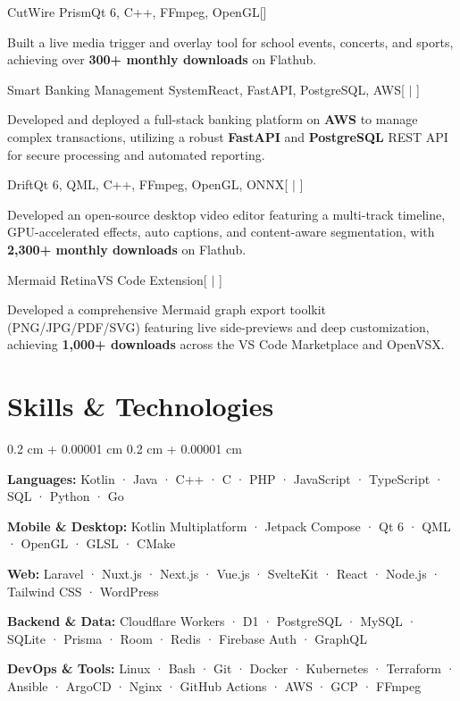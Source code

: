 \documentclass[10pt, letterpaper]{article}
\newenvironment{onecolentry}{
    \begin{adjustwidth}{
        0.2 cm + 0.00001 cm
    }{
        0.2 cm + 0.00001 cm
    }
}{
    \end{adjustwidth}
    \vspace{0.12cm}
}
\let\hrefWithoutArrow\href
\renewcommand{\href}[2]{\hrefWithoutArrow{#1}{\ifthenelse{\equal{#2}{}}{ }{#2 }\raisebox{.15ex}{\footnotesize \faExternalLink*}}}
\newcommand{\repo}[1]{\hfill\hrefWithoutArrow{#1}{\faGithub}}
\newcommand{\repolive}[2]{\hfill\hrefWithoutArrow{#1}{\faGithub} $|$ \hrefWithoutArrow{#2}{\faExternalLink*}}
\newcommand{\skillline}[2]{%
    \textbf{#1:} #2\par\vspace{0.10cm}%
}
\begin{document}
    \begin{project}{CutWire Prism}{Qt 6, C++, FFmpeg, OpenGL}[\repo{https://github.com/CutWire-Studios/SwitchX}]
        \item Built a live media trigger and overlay tool for school events, concerts, and sports, achieving over \textbf{300+ monthly downloads} on Flathub.
    \end{project}

    \begin{project}{Smart Banking Management System}{React, FastAPI, PostgreSQL, AWS}[\repolive{https://github.com/Team-SMDRS}{https://btrust.dpdns.org}]
        \item Developed and deployed a full-stack banking platform on \textbf{AWS} to manage complex transactions, utilizing a robust \textbf{FastAPI} and \textbf{PostgreSQL} REST API for secure processing and automated reporting.
    \end{project}

    \begin{project}{Drift}{Qt 6, QML, C++, FFmpeg, OpenGL, ONNX}[\repolive{https://github.com/CutWire-Studios/Drift}{https://flathub.org/apps/org.cutwire.Drift}]
        \item Developed an open-source desktop video editor featuring a multi-track timeline, GPU-accelerated effects, auto captions, and content-aware segmentation, with \textbf{2,300+ monthly downloads} on Flathub.
    \end{project}

    \begin{project}{Mermaid Retina}{VS Code Extension}[\repolive{https://github.com/NipunSGeeTH/Mermaid-Retina}{https://marketplace.visualstudio.com/items?itemName=NipunSGeeTH.mermaid-retina}]
        \item Developed a comprehensive Mermaid graph export toolkit (PNG/JPG/PDF/SVG) featuring live side-previews and deep customization, achieving \textbf{1,000+ downloads} across the VS Code Marketplace and OpenVSX.
    \end{project}

    \needspace{6.2cm}
    \section{Skills \& Technologies}
    \begin{onecolentry}
        \skillline{Languages}{Kotlin · Java · C++ · C · PHP · JavaScript · TypeScript · SQL · Python · Go}
        \skillline{Mobile \& Desktop}{Kotlin Multiplatform · Jetpack Compose · Qt 6 · QML · OpenGL · GLSL · CMake}
        \skillline{Web}{Laravel · Nuxt.js · Next.js · Vue.js · SvelteKit · React · Node.js · Tailwind CSS · WordPress}
        \skillline{Backend \& Data}{Cloudflare Workers · D1 · PostgreSQL · MySQL · SQLite · Prisma · Room · Redis · Firebase Auth  · GraphQL}
        \skillline{DevOps \& Tools}{Linux · Bash · Git · Docker · Kubernetes · Terraform · Ansible · ArgoCD  · Nginx · GitHub Actions · AWS · GCP · FFmpeg}
    \end{onecolentry}
\end{document}
